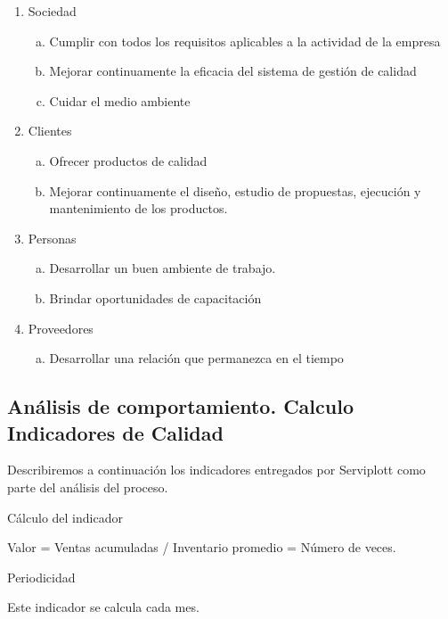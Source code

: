 		\begin{enumerate}[1)]
		\item Sociedad
		  \begin{enumerate}[a)]
		  \item Cumplir con todos los requisitos aplicables a la actividad de la empresa
		  \item  Mejorar continuamente la eficacia del sistema de gestión de calidad
		  \item  Cuidar el medio ambiente
		  \end{enumerate}
		\item Clientes
		  \begin{enumerate}[a)]
		  \item Ofrecer productos de calidad
		  \item Mejorar continuamente el diseño, estudio de propuestas, ejecución y mantenimiento de los productos.
		  \end{enumerate}
		\item Personas
		  \begin{enumerate}[a)]
		  \item Desarrollar un buen ambiente de trabajo.
		  \item Brindar oportunidades de capacitación
		  \end{enumerate}
		\item Proveedores
		  \begin{enumerate}[a)]
		  \item Desarrollar una relación que permanezca en el tiempo
		  \end{enumerate}
		\end{enumerate}
	
	\subsection{Análisis de comportamiento. Calculo Indicadores de Calidad}
	
	Describiremos a continuación los indicadores entregados por Serviplott como parte del
análisis del proceso.

Cálculo del indicador


Valor = Ventas acumuladas / Inventario promedio = Número de veces.


Periodicidad


Este indicador se calcula cada mes.

